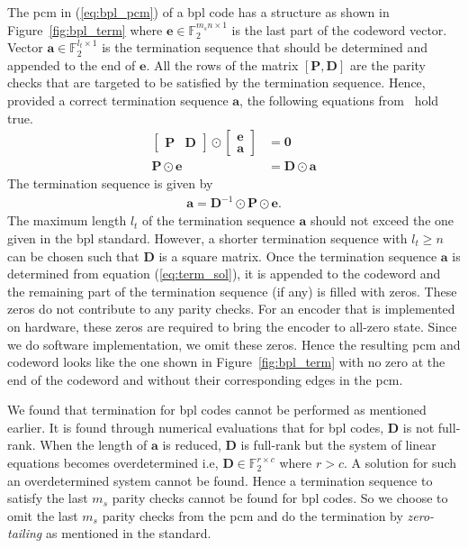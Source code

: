 The \ac{pcm} in (\ref{eq:bpl_pcm}) of a \ac{bpl} code has a structure as shown in Figure~\ref{fig:bpl_term} where $\mathbf{e}\in\mathbb{F}_2^{m_sn\times 1}$ is the last part of the codeword vector. Vector $\mathbf{a}\in\mathbb{F}_2^{l_t\times 1}$ is the termination sequence that should be determined and appended to the end of $\mathbf{e}$. All the rows of the matrix $[\mathbf{P},\mathbf{D}]$ are the parity checks that are targeted to be satisfied by the termination sequence. Hence, provided a correct termination sequence $\mathbf{a}$, the following equations from~\cite{Chen2006} hold true.
\begin{align*}
\begin{bmatrix}\mathbf{P} &\mathbf{D}\end{bmatrix}\odot
\begin{bmatrix}
\mathbf{e}\\
\mathbf{a}
\end{bmatrix}&=\mathbf{0}\\
\mathbf{P}\odot\mathbf{e}&=\mathbf{D}\odot\mathbf{a}
\end{align*}
The termination sequence is given by
\begin{align}\label{eq:term_sol}
\mathbf{a}=\mathbf{D}^{-1}\odot\mathbf{P}\odot\mathbf{e}.
\end{align}
The maximum length $l_t$ of the termination sequence $\mathbf{a}$ should not exceed the one given in the \ac{bpl} standard. However, a shorter termination sequence with $l_t\geq n$ can be chosen such that $\mathbf{D}$ is a square matrix. Once the termination sequence $\mathbf{a}$ is determined from equation (\ref{eq:term_sol}), it is appended to the codeword and the remaining part of the termination sequence (if any) is filled with zeros. These zeros do not contribute to any parity checks. For an encoder that is implemented on hardware, these zeros are required to bring the encoder to all-zero state. Since we do software implementation, we omit these zeros. Hence the resulting \ac{pcm} and codeword looks like the one shown in Figure~\ref{fig:bpl_term} with no zero at the end of the codeword and without their corresponding edges in the \ac{pcm}.

We found that termination for \ac{bpl} codes cannot be performed as mentioned earlier. It is found through numerical evaluations that for \ac{bpl} codes, $\mathbf{D}$ is not full-rank. When the length of $\mathbf{a}$ is reduced, $\mathbf{D}$ is full-rank but the system of linear equations becomes overdetermined i.e, $\mathbf{D}\in\mathbb{F}_2^{r\times c}$ where $r>c$. A solution for such an overdetermined system cannot be found. Hence a termination sequence to satisfy the last $m_s$ parity checks cannot be found for \ac{bpl} codes. So we choose to omit the last $m_s$ parity checks from the \ac{pcm} and do the termination by \emph{zero-tailing} as mentioned in the standard.

